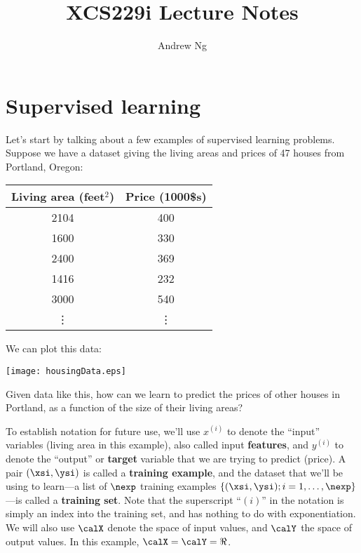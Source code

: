 \documentclass{article}
\begin{document}
\title{XCS229i Lecture Notes}
\author{Andrew Ng}
\date{}
\maketitle


\section*{Supervised learning}


Let's start by talking about a few examples of supervised learning problems.
Suppose we have a dataset giving the living areas and prices of 47 houses from
Portland, Oregon:
%
\begin{center}
\begin{tabular}{c|c}
Living area (feet$^2$) & Price (1000\$s) \\ \hline
2104 & 400  \\
1600 & 330  \\
2400 & 369  \\
1416 & 232  \\
3000 & 540  \\
\vdots & \vdots
\end{tabular}
\end{center}

We can plot this data:
\begin{center}
\texttt{[image: housingData.eps]}
\end{center}

Given data like this, how can we learn to predict the prices of other houses in Portland, as a function
of the size of their living areas?

To establish notation for future use, we'll use $x^{(i)}$ to denote the ``input'' variables (living area in this example), also called
input {\bf features}, and $y^{(i)}$ to denote the ``output'' or {\bf target}
variable that we are trying to predict (price).  A pair $(\xsi, \ysi)$ is called
a {\bf training example}, and the dataset that we'll be using to learn---a list of $\nexp$ training
examples $\{(\xsi,\ysi); i=1,\ldots,\nexp\}$---is called a {\bf training set}.  Note that the superscript
``${(i)}$'' in the notation is simply an index into the training set, and has nothing
to do with exponentiation.  We will also use $\calX$ denote the space of input
values, and $\calY$ the space of output values.  In this example,
$\calX = \calY = \Re$.
\end{document}
